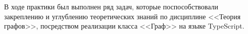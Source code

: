 \documentclass[pract,times]{SCWorks}
\begin{document}












\conclusion
В ходе практики был выполнен ряд задач, которые поспособствовали закреплению
и углублению теоретических знаний по дисциплине <<Теория графов>>, посредством
реализации класса <<Граф>> на языке TypeScript.




\appendix


\end{document}
